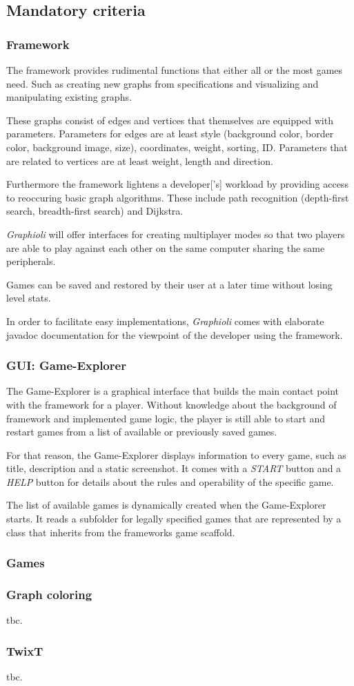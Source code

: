 \subsection{Mandatory criteria}
\subsubsection{Framework}
The framework provides rudimental functions that either all or the most games need. Such as creating new graphs from specifications and visualizing and manipulating existing graphs.\par
These graphs consist of \glspl{edge} and \glspl{vertice} that themselves are equipped with parameters. Parameters for edges are at least style (background color, border color, background image, size), coordinates, weight, sorting, \gls{ID}. Parameters that are related to vertices are at least weight, length and direction.\par
Furthermore the framework lightens a \gls{developer}['s] workload by providing access to reoccuring basic graph algorithms. These include path recognition (depth-first search, breadth-first search) and Dijkstra.\par
\emph{Graphioli} will offer interfaces for creating multiplayer modes so that two \glspl{player} are able to play against each other on the same computer sharing the same peripherals.\par
Games can be saved and restored by their user at a later time without losing \gls{level} stats.\par
In order to facilitate easy implementations, \emph{Graphioli} comes with elaborate \Gls{javadoc} documentation for the viewpoint of the developer using the framework.\par


\subsubsection{GUI: Game-Explorer}
The Game-Explorer is a graphical interface that builds the main contact point with the framework for a player. Without knowledge about the background of framework and implemented game logic, the player is still able to start and restart games from a list of available or previously saved games.\par
For that reason, the Game-Explorer displays information to every game, such as title, description and a static screenshot. It comes with a \emph{START} button and a \emph{HELP} button for details about the rules and operability of the specific game.\par
The list of available games is dynamically created when the Game-Explorer starts. It reads a subfolder for legally specified games that are represented by a class that inherits from the frameworks game scaffold.

\subsubsection{Games}
\subsubsection{Graph coloring}
tbc.\par

\subsubsection{TwixT}
tbc.\par